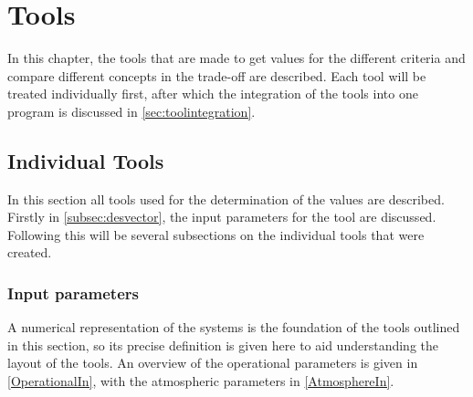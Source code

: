 \newpage
\chapter{Tools}
\label{CriteriaTools}



In this chapter, the tools that are made to get values for the different criteria and compare different concepts in the trade-off are described. Each tool will be treated individually first, after which the integration of the tools into one program is discussed in \autoref{sec:toolintegration}. 

\section{Individual Tools}
\label{sec:Tools}

In this section all tools used for the determination of the values are described. Firstly in \autoref{subsec:desvector}, the input parameters for the tool are discussed. Following this will be several subsections on the individual tools that were created. 

\subsection{Input parameters}
\label{subsec:desvector}
A numerical representation of the systems is the foundation of the tools outlined in this section, so its precise definition is given here to aid understanding the layout of the tools. An overview of the operational parameters is given in \autoref{OperationalIn}, with the atmospheric parameters in \autoref{AtmosphereIn}.



